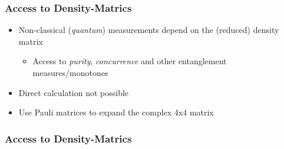     \begin{frame}[t]
        \frametitle{Access to Density-Matrics}

        \begin{itemize}
            \item Non-classical (\emph{quantum}) measurements depend on the (reduced) density matrix \pause
                \begin{itemize}
                    \item Access to \emph{purity}, \emph{concurrence} and other entanglement measures/monotones\pause
                \end{itemize}
            \item Direct calculation not possible
        \end{itemize}

        \vspace{-0.2cm}

        \vspace{-0.2cm}
        \pause
        \begin{itemize}
            \item Use Pauli matrices to expand the complex 4x4 matrix
        \end{itemize}


        \onslide %
    \end{frame}

    \begin{frame}[t]
        \frametitle{Access to Density-Matrics}


        \onslide %
    \end{frame}